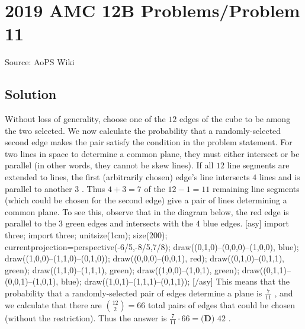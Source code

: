 \documentclass[12pt]{article}
\begin{document}
\section*{{2019 AMC 12B Problems/Problem 11}}
Source: AoPS Wiki

\subsection*{Solution}
Without loss of generality, choose one of the $12$ edges of the cube to be among the two selected. We now calculate the probability that a randomly-selected second edge makes the pair satisfy the condition in the problem statement. For two lines in space to determine a common plane, they must either intersect or be parallel (in other words, they cannot be skew lines). If all $12$ line segments are extended to lines, the first (arbitrarily chosen) edge's line intersects $4$ lines and is parallel to another $3$ . Thus $4+3=7$ of the $12-1=11$ remaining line segments (which could be chosen for the second edge) give a pair of lines determining a common plane. To see this, observe that in the diagram below, the red edge is parallel to the $3$ green edges and intersects with the $4$ blue edges. [asy] import three; import three; unitsize(1cm); size(200); currentprojection=perspective(-6/5,-8/5,7/8); draw((0,1,0)--(0,0,0)--(1,0,0), blue); draw((1,0,0)--(1,1,0)--(0,1,0)); draw((0,0,0)--(0,0,1), red); draw((0,1,0)--(0,1,1), green); draw((1,1,0)--(1,1,1), green); draw((1,0,0)--(1,0,1), green); draw((0,1,1)--(0,0,1)--(1,0,1), blue); draw((1,0,1)--(1,1,1)--(0,1,1)); [/asy] This means that the probability that a randomly-selected pair of edges determine a plane is $\frac{7}{11}$ , and we calculate that there are ${12 \choose 2} = 66$ total pairs of edges that could be chosen (without the restriction). Thus the answer is $\frac{7}{11} \cdot 66 =\boxed{\textbf{(D) }42}$ .
\end{document}
